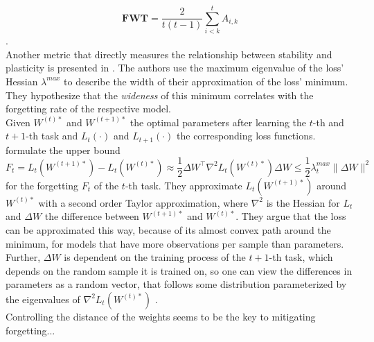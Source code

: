 \begin{equation}
	\mathbf{FWT} = \frac{2}{t(t-1)}\sum_{i < k }^{t} A_{i,k}
\end{equation}
\cite{díazrodríguez2018dontforgetforgettingnew}.\\
Another metric that directly measures the relationship between stability and plasticity is presented in \cite{mirzadeh2020understandingroletrainingregimes}. The authors use the maximum eigenvalue of the loss' Hessian $\lambda^{max}$ to describe the width of their approximation of the loss' minimum. They hypothesize that the \textit{wideness} of this minimum correlates with the forgetting rate of the respective model.\\
Given $W^{(t)*}$ and $W^{(t+1)*}$ the optimal parameters after learning the $t$-th and $t+1$-th task and $L_t(\cdot)$ and $L_{t+1}(\cdot)$ the corresponding loss functions. \citeauthor{mirzadeh2020understandingroletrainingregimes} formulate the upper bound
\begin{equation}\label{2TA}
	F_t = L_t(W^{(t+1)*}) - L_t(W^{(t)*}) \approx \frac{1}{2}{\Delta W}^\top \nabla^2 L_t(W^{(t)*}) \Delta W \leq \frac{1}{2}\lambda_t^{max}\lVert \Delta W \rVert^2
\end{equation}
for the forgetting $F_t$ of the $t$-th task. They approximate $L_t(W^{(t+1)*})$ around $W^{(t)*}$ with a second order Taylor approximation, where $\nabla^2$ is the Hessian for $L_t$ and $\Delta W$ the difference between $W^{(t+1)*}$ and $W^{(t)*}$. They argue that the loss can be approximated this way, because of its almost convex path around the minimum, for models that have more observations per sample than parameters.\\
Further, ${\Delta W}$ is dependent on the training process of the $t+1$-th task, which depends on the random sample it is trained on, so one can view the differences in parameters as a random vector, that follows some distribution parameterized by the eigenvalues of $\nabla^2 L_t(W^{(t)*})$ \cite{mirzadeh2020understandingroletrainingregimes}.\\

Controlling the distance of the weights seems to be the key to mitigating forgetting...